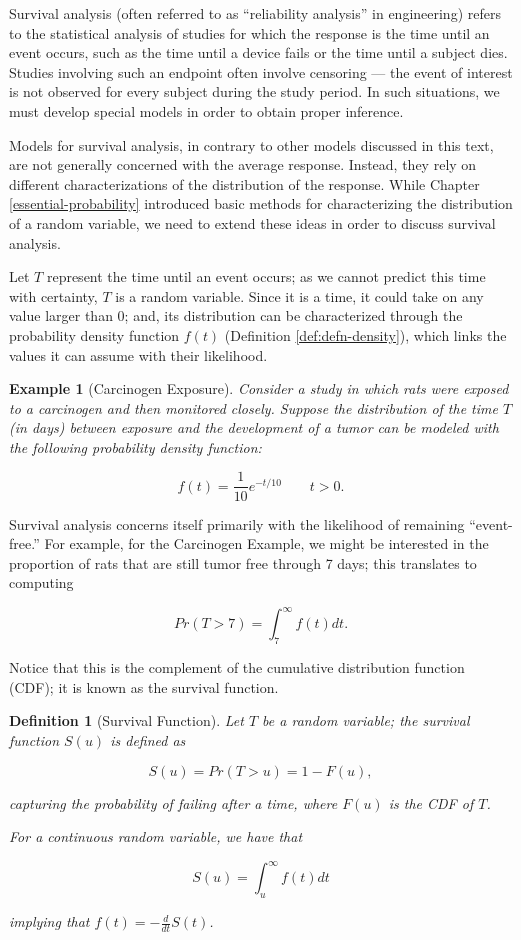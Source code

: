 \documentclass[
]{book}
\theoremstyle{plain}
\theoremstyle{mydefn}
\newtheorem{definition}{Definition}[chapter]
\theoremstyle{myexmpl}
\newtheorem{example}{Example}[chapter]
\theoremstyle{remark}
\begin{document}
Survival analysis (often referred to as ``reliability analysis'' in engineering) refers to the statistical analysis of studies for which the response is the time until an event occurs, such as the time until a device fails or the time until a subject dies. Studies involving such an endpoint often involve censoring --- the event of interest is not observed for every subject during the study period. In such situations, we must develop special models in order to obtain proper inference.

Models for survival analysis, in contrary to other models discussed in this text, are not generally concerned with the average response. Instead, they rely on different characterizations of the distribution of the response. While Chapter \ref{essential-probability} introduced basic methods for characterizing the distribution of a random variable, we need to extend these ideas in order to discuss survival analysis.

Let \(T\) represent the time until an event occurs; as we cannot predict this time with certainty, \(T\) is a random variable. Since it is a time, it could take on any value larger than 0; and, its distribution can be characterized through the probability density function \(f(t)\) (Definition \ref{def:defn-density}), which links the values it can assume with their likelihood.

\begin{example}[Carcinogen Exposure]
Consider a study in which rats were exposed to a carcinogen and then monitored closely. Suppose the distribution of the time \(T\) (in days) between exposure and the development of a tumor can be modeled with the following probability density function:

\[f(t) = \frac{1}{10} e^{-t/10} \qquad t > 0.\]
\end{example}

Survival analysis concerns itself primarily with the likelihood of remaining ``event-free.'' For example, for the Carcinogen Example, we might be interested in the proportion of rats that are still tumor free through 7 days; this translates to computing

\[Pr(T > 7) = \int_{7}^{\infty} f(t) dt.\]

Notice that this is the complement of the cumulative distribution function (CDF); it is known as the survival function.

\begin{definition}[Survival Function]
Let \(T\) be a random variable; the survival function \(S(u)\) is defined as

\[S(u) = Pr(T > u) = 1 - F(u),\]

capturing the probability of failing \emph{after} a time, where \(F(u)\) is the CDF of \(T\).

For a continuous random variable, we have that

\[S(u) = \int_{u}^{\infty} f(t) dt\]

implying that \(f(t) = -\frac{d}{dt} S(t)\).
\end{definition}
\end{document}

